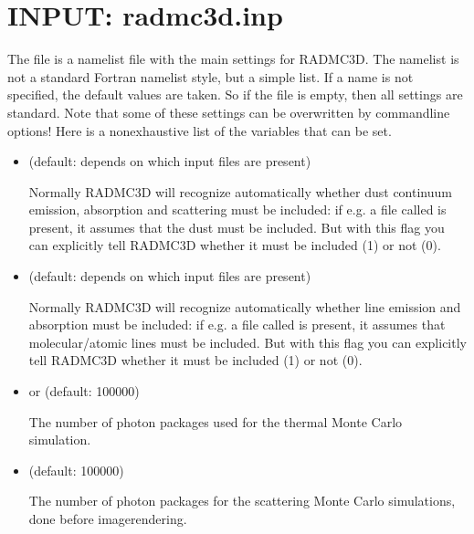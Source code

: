 \documentclass[letterpaper,10pt,english]{sphinxmanual}
\begin{document}
\section{INPUT: radmc3d.inp}
\label{\detokenize{inputoutputfiles:input-radmc3d-inp}}\label{\detokenize{inputoutputfiles:sec-radmc-inp}}
The  file is a namelist file with the main settings for
RADMC\sphinxhyphen{}3D. The namelist is not a standard Fortran namelist style, but a simple
 list. If a name is not specified, the default values are taken.
So if the  file is empty, then all settings are standard.  Note
that some of these settings can be overwritten by command\sphinxhyphen{}line options! Here
is a non\sphinxhyphen{}exhaustive list of the variables that can be set.
\begin{itemize}
\item {} 
 (default: depends on which input files are present)

Normally RADMC\sphinxhyphen{}3D will recognize automatically whether dust continuum
emission, absorption and scattering must be included: if e.g. a file
called  is present, it assumes that the dust
must be included. But with this flag you can explicitly tell RADMC\sphinxhyphen{}3D
whether it must be included (1) or not (0).

\item {} 
 (default: depends on which input files are present)

Normally RADMC\sphinxhyphen{}3D will recognize automatically whether line emission and
absorption must be included: if e.g. a file called 
is present, it assumes that molecular/atomic lines must be included. But
with this flag you can explicitly tell RADMC\sphinxhyphen{}3D whether it must be
included (1) or not (0).

\item {} 
 or  (default: 100000)

The number of photon packages used for the thermal Monte Carlo simulation.

\item {} 
 (default: 100000)

The number of photon packages for the scattering Monte Carlo simulations,
done before image\sphinxhyphen{}rendering.


\end{itemize}
\end{document}
